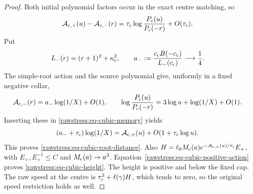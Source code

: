 \begin{proof}
Both initial polynomial factors occur in the exact centre matching, so
\begin{equation}\label{rawstress:eq-cubic-memory}
 \mathcal A_{{\rm c},+}(u)-\mathcal A_{{\rm c},-}(r)
 =\tau_{\rm c}\log\frac{P_{\rm c}(u)}{P_{\rm c}(-r)}+O(\tau_{\rm c}).
\end{equation}
Put
\[
 L_-(r)=(r+1)^2+\kappa_{\rm c}^2,\qquad
 a_-:=\frac{c_{\rm c}B(-c_{\rm c})}{L_-(c_{\rm c})}\longrightarrow\frac14.
\]
The simple-root action and the source polynomial give, uniformly in a
fixed negative collar,
\[
 \mathcal A_{{\rm c},-}(r)=a_-\log(1/X)+O(1),\qquad
 \log\frac{P_{\rm c}(u)}{P_{\rm c}(-r)}
                               =3\log u+\log(1/X)+O(1).
\]
Inserting these in \eqref{rawstress:eq-cubic-memory} yields
\[
 (a_-+\tau_{\rm c})\log(1/X)
             =\mathcal A_{{\rm c},+}(u)
                              +O(1+\tau_{\rm c}\log u).
\]
This proves \eqref{rawstress:eq-cubic-root-distance}. Also
\(H=\ell_0M_{\rm c}(a)
e^{-\mathcal A_{{\rm c},+}(u)/\tau_{\rm c}}E_+\), with
\(E_+,E_+^{-1}\le C\) and \(M_{\rm c}(a)\to a^3\).
Equation~\eqref{rawstress:eq-cubic-positive-action} proves
\eqref{rawstress:eq-cubic-height}. The height is positive and below
the fixed cap. The raw speed at the centre is
\(\tau_{\rm c}^3+\ell(\gamma)H\), which tends to zero, so the
original speed restriction holds as well.


\end{proof}
